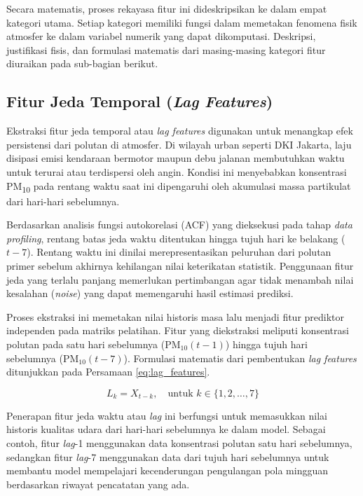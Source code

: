 Secara matematis, proses rekayasa fitur ini dideskripsikan ke dalam empat kategori utama. Setiap kategori memiliki fungsi dalam memetakan fenomena fisik atmosfer ke dalam variabel numerik yang dapat dikomputasi. Deskripsi, justifikasi fisis, dan formulasi matematis dari masing-masing kategori fitur diuraikan pada sub-bagian berikut.

\subsection{Fitur Jeda Temporal (\textit{Lag Features})}

Ekstraksi fitur jeda temporal atau \textit{lag features} digunakan untuk menangkap efek persistensi dari polutan di atmosfer. Di wilayah urban seperti DKI Jakarta, laju disipasi emisi kendaraan bermotor maupun debu jalanan membutuhkan waktu untuk terurai atau terdispersi oleh angin. Kondisi ini menyebabkan konsentrasi PM\textsubscript{10} pada rentang waktu saat ini dipengaruhi oleh akumulasi massa partikulat dari hari-hari sebelumnya.

Berdasarkan analisis fungsi autokorelasi (ACF) yang dieksekusi pada tahap \textit{data profiling}, rentang batas jeda waktu ditentukan hingga tujuh hari ke belakang ($t-7$). Rentang waktu ini dinilai merepresentasikan peluruhan dari polutan primer sebelum akhirnya kehilangan nilai keterikatan statistik. Penggunaan fitur jeda yang terlalu panjang memerlukan pertimbangan agar tidak menambah nilai kesalahan (\textit{noise}) yang dapat memengaruhi hasil estimasi prediksi.

Proses ekstraksi ini memetakan nilai historis masa lalu menjadi fitur prediktor independen pada matriks pelatihan. Fitur yang diekstraksi meliputi konsentrasi polutan pada satu hari sebelumnya ($\text{PM}_{10}(t-1)$) hingga tujuh hari sebelumnya ($\text{PM}_{10}(t-7)$). Formulasi matematis dari pembentukan \textit{lag features} ditunjukkan pada Persamaan \ref{eq:lag_features}.

\begin{equation}
    L_k = X_{t-k}, \quad \text{untuk } k \in \{1, 2, \dots, 7\}
    \label{eq:lag_features}
\end{equation}

Penerapan fitur jeda waktu atau \textit{lag} ini berfungsi untuk memasukkan nilai historis kualitas udara dari hari-hari sebelumnya ke dalam model. Sebagai contoh, fitur \textit{lag}-1 menggunakan data konsentrasi polutan satu hari sebelumnya, sedangkan fitur \textit{lag}-7 menggunakan data dari tujuh hari sebelumnya untuk membantu model mempelajari kecenderungan pengulangan pola mingguan berdasarkan riwayat pencatatan yang ada.

